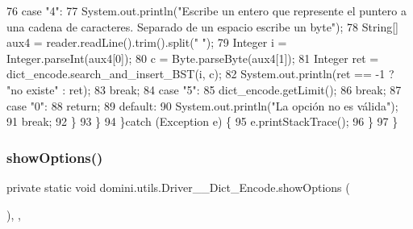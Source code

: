 \begin{DoxyCode}
76                 \textcolor{keywordflow}{case} \textcolor{stringliteral}{"4"}:
77                     System.out.println(\textcolor{stringliteral}{"Escribe un entero que represente el puntero a una cadena de
       caracteres. Separado de un espacio escribe un byte"});
78                     String[] aux4 = reader.readLine().trim().split(\textcolor{stringliteral}{" "});
79                     Integer i = Integer.parseInt(aux4[0]);
80                     c = Byte.parseByte(aux4[1]);
81                     Integer ret = dict\_encode.search\_and\_insert\_BST(i, c);
82                     System.out.println(ret == -1 ? \textcolor{stringliteral}{"no existe"} : ret);
83                 \textcolor{keywordflow}{break};
84                 \textcolor{keywordflow}{case} \textcolor{stringliteral}{"5"}:
85                     dict\_encode.getLimit();
86                 \textcolor{keywordflow}{break};
87                 \textcolor{keywordflow}{case} \textcolor{stringliteral}{"0"}:
88                     \textcolor{keywordflow}{return};
89                 \textcolor{keywordflow}{default}:
90                     System.out.println(\textcolor{stringliteral}{"La opción no es válida"});
91                 \textcolor{keywordflow}{break};
92             \}
93         \}
94     \}\textcolor{keywordflow}{catch} (Exception e) \{
95         e.printStackTrace();
96     \}
97     \}
\end{DoxyCode}
\mbox{\label{classdomini_1_1utils_1_1Driver____Dict__Encode_a8b24c280193457c6620b2b5906018c34}} 
\subsubsection{\texorpdfstring{show\+Options()}{showOptions()}}
{\footnotesize\ttfamily private static void domini.\+utils.\+Driver\+\_\+\+\_\+\+Dict\+\_\+\+Encode.\+show\+Options (\begin{DoxyParamCaption}{ }\end{DoxyParamCaption})\hspace{0.3cm}{\ttfamily [inline]}, {\ttfamily [static]}, {\ttfamily [private]}}



